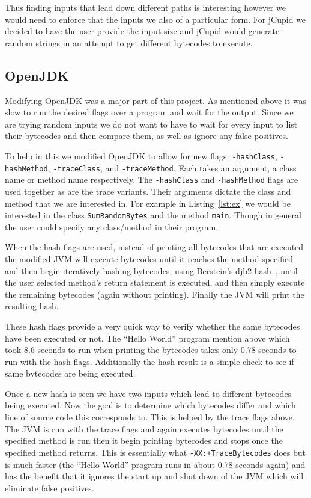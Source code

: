 \documentclass[letterpaper,twocolumn,10pt]{article}
\begin{document}
Thus finding inputs that lead down different paths is interesting however we would need to enforce that the inputs we also of a particular form. For jCupid we decided to have the user provide the input size and jCupid would generate random strings in an attempt to get different bytecodes to execute.

\subsection{OpenJDK}\label{sec:OpenJDK}

Modifying OpenJDK was a major part of this project. As mentioned above it was slow to run the desired flags over a program and wait for the output. Since we are trying random inputs we do not want to have to wait for every input to list their bytecodes and then compare them, as well as ignore any false positives.

To help in this we modified OpenJDK to allow for new flags: \texttt{-hashClass}, \texttt{-hashMethod}, \texttt{-traceClass}, and \texttt{-traceMethod}. Each takes an argument, a class name or method name respectively. The \texttt{-hashClass} and \texttt{-hashMethod} flags are used together as are the trace variants. Their arguments dictate the class and method that we are interested in. For example in Listing~\ref{lst:ex} we would be interested in the class \texttt{SumRandomBytes} and the method \texttt{main}. Though in general the user could specify any class/method in their program. 

When the hash flags are used, instead of printing all bytecodes that are executed the modified JVM will execute bytecodes until it reaches the method specified and then begin iteratively hashing bytecodes, using Berstein's djb2 hash~\cite{djb2Hash}, until the user selected method's  return statement is executed, and then simply execute the remaining bytecodes (again without printing). Finally the JVM will print the resulting hash. 

These hash flags provide a very quick way to verify whether the same bytecodes have been executed or not. The ``Hello World'' program mention above which took 8.6 seconds to run when printing the bytecodes takes only 0.78 seconds to run with the hash flags. Additionally the hash result is a simple check to see if same bytecodes are being executed.

Once a new hash is seen we have two inputs which lead to different bytecodes being executed. Now the goal is to determine which bytecodes differ and which line of source code this corresponds to. This is helped by the trace flags above. The JVM is run with the trace flags and again executes bytecodes until the specified method is run then it begin printing bytecodes and stops once the specified method returns. This is essentially what \texttt{-XX:+TraceBytecodes} does but is much faster (the ``Hello World'' program runs in about 0.78 seconds again) and has the benefit that it ignores the start up and shut down of the JVM which will eliminate false positives.
\end{document}
